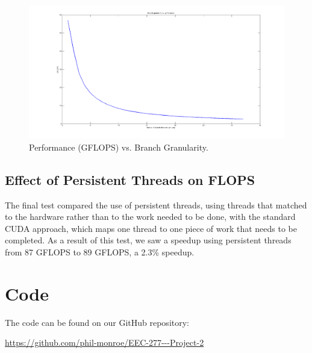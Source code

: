 \documentclass[12pt] {article}
\begin{document}
\begin{figure}[ht!]
	\centering
	\includegraphics[width=5in]{figures/branch_v_perf.png}
	\caption{Performance (GFLOPS) vs. Branch Granularity.}
\end{figure}
\FloatBarrier

\subsection{Effect of Persistent Threads on FLOPS}
The final test compared the use of persistent threads, using threads that matched to the hardware rather than to the work needed to be done, with the standard CUDA approach, which maps one thread to one piece of work that needs to be completed. As a result of this test, we saw a speedup using persistent threads from 87 GFLOPS to 89 GFLOPS, a 2.3\% speedup.

\clearpage
\section{Code}
\begin{center}
The code can be found on our GitHub repository:

\url {https://github.com/phil-monroe/EEC-277---Project-2}
\end{center}
% 
% 	
% 	
% 		
% 		
% 	
% 	
\end{document}
